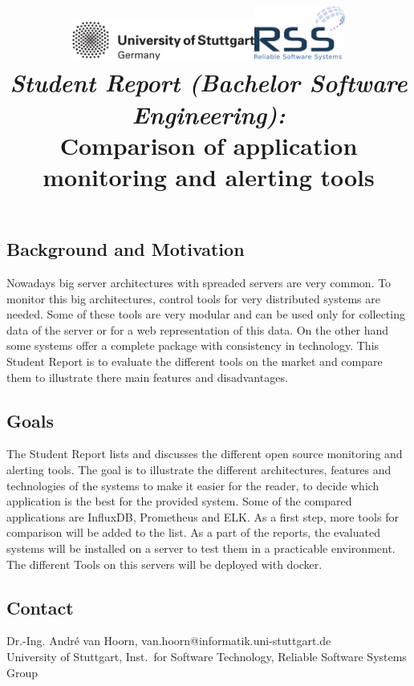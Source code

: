 \documentclass[a4paper,12pt]{article}
\date{}
\title{
\includegraphics[width=6cm]{figures/stuttgart-vector.pdf}\hfill{\includegraphics[width=3cm]{figures/rss_logo.pdf}}
\quad \\ [0.5cm]
{\large \textit{Student Report (Bachelor Software Engineering):}} \\ [1mm]
{\Large Comparison of application monitoring and alerting tools}
}
\begin{document}
	

\maketitle

\thispagestyle{empty}

\vspace{-2.5cm}


\subsection*{Background and Motivation}
Nowadays big server architectures with spreaded servers are very common. To monitor this big architectures, control tools for very distributed systems are needed. Some of these tools are very modular and can be used only for collecting data of the server or for a web representation of this data. On the other hand some systems offer a complete package with consistency in technology.\cite{Heger2017}
This Student Report is to evaluate the different tools on the market and compare them to illustrate there main features and disadvantages.

\subsection*{Goals}
The Student Report lists and discusses the different open source monitoring and alerting tools. The goal is to illustrate the different architectures, features and technologies of the systems to make it easier for the reader, to decide which application is the best for the provided system.
Some of the compared applications are InfluxDB, Prometheus and ELK. As a first step, more tools for comparison will be added to the list.
As a part of the reports, the evaluated systems will be installed on a server to test them in a practicable environment. The different Tools on this servers will be deployed with docker.


\begin{scriptsize}


\end{scriptsize}

\subsection*{Contact}
Dr.-Ing. André van Hoorn, van.hoorn@informatik.uni-stuttgart.de \\
University of Stuttgart, Inst.\ for Software Technology, Reliable Software Systems Group \\
\end{document}
